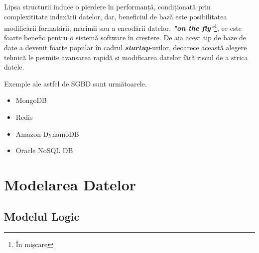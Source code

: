 \documentclass[12pt. a4paper]{report}
\begin{document}
Lipsa structurii induce o pierdere în performanță, condiționată prin complexititate indexării datelor, dar, beneficiul de bază este posibilitatea modificării formatării, mărimii sau a encodării datelor, \emph{\textbf{"on the fly"}}\footnote{În mișcare}, ce este foarte benefic pentru o sistemă software în creștere. De aia acest tip de baze de date a devenit foarte popular în cadrul \emph{\textbf{startup}}-urilor, deoarece această alegere tehnică le permite avansarea rapidă și modificarea datelor fără riscul de a strica datele.

Exemple ale astfel de SGBD sunt următoarele.
\begin{itemize}
	\item MongoDB
	\item Redis
	\item Amazon DynamoDB
	\item Oracle NoSQL DB
\end{itemize}

\chapter{Modelarea Datelor}

\section{Modelul Logic}
\end{document}
